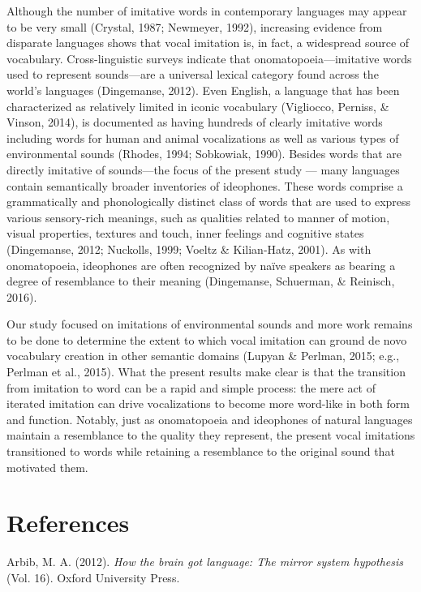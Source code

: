 \documentclass[english,floatsintext,man]{apa6}
\theoremstyle{definition}
\theoremstyle{definition}
\theoremstyle{remark}
\begin{document}
Although the number of imitative words in contemporary languages may
appear to be very small (Crystal, 1987; Newmeyer, 1992), increasing
evidence from disparate languages shows that vocal imitation is, in
fact, a widespread source of vocabulary. Cross-linguistic surveys
indicate that onomatopoeia---imitative words used to represent
sounds---are a universal lexical category found across the world's
languages (Dingemanse, 2012). Even English, a language that has been
characterized as relatively limited in iconic vocabulary (Vigliocco,
Perniss, \& Vinson, 2014), is documented as having hundreds of clearly
imitative words including words for human and animal vocalizations as
well as various types of environmental sounds (Rhodes, 1994; Sobkowiak,
1990). Besides words that are directly imitative of sounds---the focus
of the present study --- many languages contain semantically broader
inventories of ideophones. These words comprise a grammatically and
phonologically distinct class of words that are used to express various
sensory-rich meanings, such as qualities related to manner of motion,
visual properties, textures and touch, inner feelings and cognitive
states (Dingemanse, 2012; Nuckolls, 1999; Voeltz \& Kilian-Hatz, 2001).
As with onomatopoeia, ideophones are often recognized by naïve speakers
as bearing a degree of resemblance to their meaning (Dingemanse,
Schuerman, \& Reinisch, 2016).

Our study focused on imitations of environmental sounds and more work
remains to be done to determine the extent to which vocal imitation can
ground de novo vocabulary creation in other semantic domains (Lupyan \&
Perlman, 2015; e.g., Perlman et al., 2015). What the present results
make clear is that the transition from imitation to word can be a rapid
and simple process: the mere act of iterated imitation can drive
vocalizations to become more word-like in both form and function.
Notably, just as onomatopoeia and ideophones of natural languages
maintain a resemblance to the quality they represent, the present vocal
imitations transitioned to words while retaining a resemblance to the
original sound that motivated them.

\section{References}\label{references}

\setlength{\parindent}{-0.5in} \setlength{\leftskip}{0.5in}

\hypertarget{refs}{}
\hypertarget{ref-Arbib:2012htb}{}
Arbib, M. A. (2012). \emph{How the brain got language: The mirror system
hypothesis} (Vol. 16). Oxford University Press.
\end{document}
